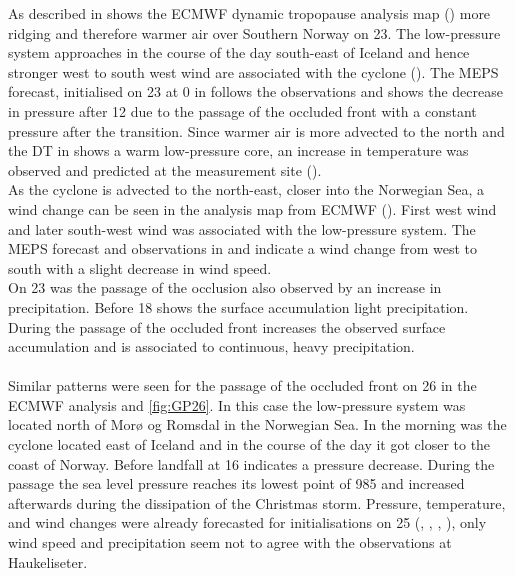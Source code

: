 \pagebreak
\noindent
As described in  shows the ECMWF dynamic tropopause analysis map () more ridging and therefore warmer air over Southern Norway on \SI{23}{\dec}. The low-pressure system approaches in the course of the day south-east of Iceland and hence stronger west to south west wind are associated with the cyclone (). The MEPS forecast, initialised on \SI{23}{\dec} at \SI{0}{\UTC} in  follows the observations and shows the decrease in pressure after \SI{12}{\UTC} due to the passage of the occluded front with a constant pressure after the transition. Since warmer air is more advected to the north and the DT in  shows a warm low-pressure core, an increase in temperature was observed and predicted at the measurement site (). 
\\
As the cyclone is advected to the north-east, closer into the Norwegian Sea, a wind change can be seen in the analysis map from ECMWF (). First west wind and later south-west wind was associated with the low-pressure system. The MEPS forecast and observations in  and  indicate a wind change from west to south with a slight decrease in wind speed.
\\
On \SI{23}{\dec} was the passage of the occlusion also observed by an increase in precipitation. Before \SI{18}{\UTC} shows the surface accumulation light precipitation. During the passage of the occluded front increases the observed surface accumulation and is associated to continuous, heavy precipitation.
\\
\\
Similar patterns were seen for the passage of the occluded front on \SI{26}{\dec} in the ECMWF analysis  and \ref{fig:GP26}. In this case the low-pressure system was located north of Morø og Romsdal in the Norwegian Sea. In the morning was the cyclone located east of Iceland and in the course of the day it got closer to the coast of Norway. Before landfall at \SI{16}{\UTC} indicates  a pressure decrease. During the passage the sea level pressure reaches its lowest point of \SI{985}{\hPa} and increased afterwards during the dissipation of the Christmas storm. Pressure, temperature, and wind changes were already forecasted for initialisations on \SI{25}{\dec} (, , , ), only wind speed and precipitation seem not to agree with the observations at Haukeliseter.
